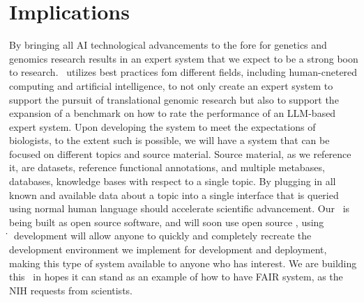 \section{Implications}
By bringing all AI technological advancements to the fore for genetics and genomics research results in an expert system that we expect to be a strong boon to research.
\project\ utilizes best practices fom different fields, including human-cnetered computing and artificial intelligence, to not only create an expert system to support the pursuit of translational genomic research but also to support the expansion of a benchmark on how to rate the performance of an LLM-based expert system.
Upon developing the system to meet the expectations of biologists, to the extent such is possible, we will have a system that can be focused on different topics and source material.
Source material, as we reference it, are datasets, reference functional annotations, and multiple metabases, databases, knowledge bases with respect to a single topic.
By plugging in all known and available data about a topic into a single interface that is queried using normal human language should accelerate scientific advancement.
Our \project\ is being built as open source software, and will soon use open source \llms, using \guix\.
\guix\ development will allow anyone to quickly and completely recreate the development environment we implement for development and deployment, making this type of system available to anyone who has interest.
We are building this \project\ in hopes it can stand as an example of how to have FAIR system, as the NIH requests from scientists.